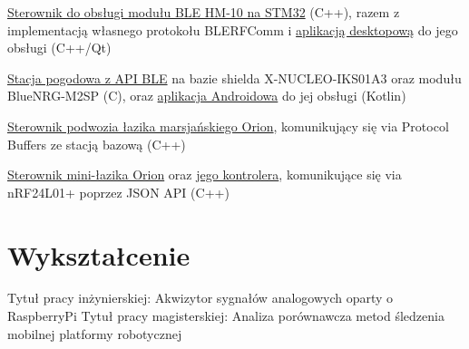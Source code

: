 \documentclass[a4paper]{comcv}
\begin{document}
\begin{tightlist}
    \item \href{https://github.com/SteelPh0enix/STM32_HM10_Driver}{Sterownik do obsługi modułu BLE HM-10 na STM32} (C++), razem z implementacją własnego protokołu BLERFComm i \href{https://github.com/SteelPh0enix/BLERFCommClient}{aplikacją desktopową} do jego obsługi (C++/Qt)
    \item \href{https://github.com/SteelPh0enix/BLEWeatherStation}{Stacja pogodowa z API BLE} na bazie shielda X-NUCLEO-IKS01A3 oraz modułu BlueNRG-M2SP (C), oraz \href{https://github.com/SteelPh0enix/WeatherStationAndroidApp}{aplikacja Androidowa} do jej obsługi (Kotlin)
    \item \href{https://github.com/SteelPh0enix/OrionChassisDriverV3}{Sterownik podwozia łazika marsjańskiego Orion}, komunikujący się via Protocol Buffers ze stacją bazową (C++)
    \item \href{https://github.com/SteelPh0enix/Orion-Mini-Rover}{Sterownik mini-łazika Orion} oraz \href{https://github.com/SteelPh0enix/Orion-Mini-Rover}{jego kontrolera}, komunikujące się via nRF24L01+ poprzez JSON API (C++)
\end{tightlist}

\vspace{\topsep}

\section{Wykształcenie}

\vspace{\topsep}
Tytuł pracy inżynierskiej: Akwizytor sygnałów analogowych oparty o RaspberryPi
\vspace{\topsep}
Tytuł pracy magisterskiej: Analiza porównawcza metod śledzenia mobilnej platformy robotycznej

\vspace{\topsep}
\end{document}
